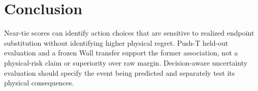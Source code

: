 \documentclass{article}
\begin{document}
\section{Conclusion}

Near-tie scores can identify action choices that are sensitive to realized
endpoint substitution without identifying higher physical regret. Push-T
held-out evaluation and a frozen Wall transfer support the former association,
not a physical-risk claim or superiority over raw margin. Decision-aware
uncertainty evaluation should specify the event being predicted and separately
test its physical consequences.

\clearpage

\clearpage

\end{document}
